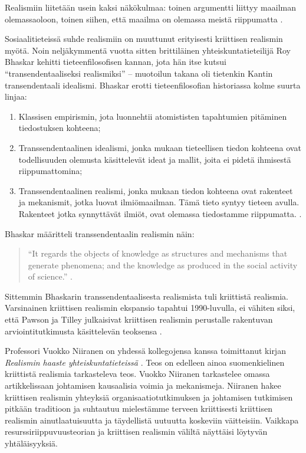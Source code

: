 Realismiin liitetään usein kaksi näkökulmaa: toinen argumentti liittyy
maailman olemassaoloon, toinen siihen, että maailma on olemassa meistä
riippumatta \cite{sep-realism}.

Sosiaalitieteissä suhde realismiin on muuttunut erityisesti kriittisen
realismin myötä. Noin neljäkymmentä vuotta sitten brittiläinen
yhteiskuntatieteilijä Roy Bhaskar kehitti tieteenfilosofisen kannan,
jota hän itse kutsui ``transendentaaliseksi realismiksi'' -- muotoilun
takana oli tietenkin Kantin transendentaali idealismi. Bhaskar erotti
tieteenfilosofian historiassa kolme suurta linjaa:

\begin{enumerate}

\item
  Klassisen empirismin, jota luonnehtii atomististen tapahtumien
  pitäminen tiedostuksen kohteena;
\item
  Transsendentaalinen idealismi, jonka mukaan tieteellisen tiedon
  kohteena ovat todellisuuden olemusta käsittelevät ideat ja mallit,
  joita ei pidetä ihmisestä riippumattomina;
\item
  Transsendentaalinen realismi, jonka mukaan tiedon kohteena ovat
  rakenteet ja mekanismit, jotka luovat ilmiömaailman. Tämä tieto syntyy
  tieteen avulla. Rakenteet jotka synnyttävät ilmiöt, ovat olemassa
  tiedostamme riippumatta. \citep[][277]{Mantysaari_1991}.
\end{enumerate}

Bhaskar määritteli transsendentaalin realismin näin:

\begin{quote}
``It regards the objects of knowledge as structures and mechanisms that
generate phenomena; and the knowledge as produced in the social activity
of science.'' \citep{Bhaskar_1975}.
\end{quote}

Sittemmin Bhaskarin transsendentaalisesta realismista tuli kriittistä
realismia. Varsinainen kriittisen realismin ekspansio tapahtui
1990-luvulla, ei vähiten siksi, että Pawson ja Tilley julkaisivat
kriittisen realismin perustalle rakentuvan arviointitutkimusta
käsittelevän teoksensa \citep{RefWorks:1045}.

Professori Vuokko Niiranen on yhdessä kollegojensa kanssa toimittanut
kirjan \emph{Realismin haaste yhteiskuntatieteissä} \citep{Solr-jykdok.1004015}.
Teos on edelleen ainoa suomenkielinen kriittistä realismia tarkasteleva
teos. Vuokko Niiranen tarkastelee omassa artikkelissaan johtamisen
kausaalisia voimia ja mekanismeja. \citep{niiranen2006} Niiranen hakee
kriittisen realismin yhteyksiä organisaatiotutkimuksen ja johtamisen
tutkimisen pitkään traditioon ja suhtautuu mielestämme terveen
kriittisesti kriittisen realismin ainutlaatuisuutta ja täydellistä
uutuutta koskeviin väitteisiin. Vaikkapa resurssiriippuvuusteorian ja
kriittisen realismin väliltä näyttäisi löytyvän yhtäläisyyksiä.

\par\null
